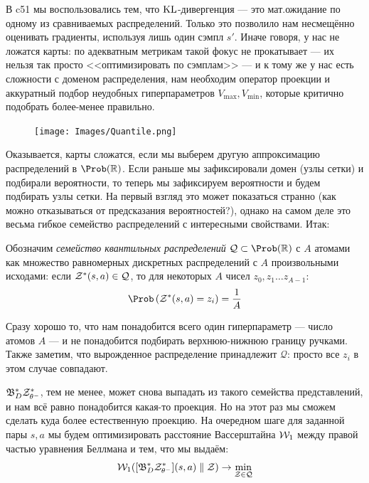 В c51 мы воспользовались тем, что $\operatorname{KL}$-дивергенция --- это мат.ожидание по одному из сравниваемых распределений. Только это позволило нам несмещённо оценивать градиенты, используя лишь один сэмпл $s'$. Иначе говоря, у нас не ложатся карты: по адекватным метрикам такой фокус не прокатывает --- их нельзя так просто <<оптимизировать по сэмплам>> --- и к тому же у нас есть сложности с доменом распределения, нам необходим оператор проекции и аккуратный подбор неудобных гиперпараметров $V_{\max}, V_{\min}$, которые критично подобрать более-менее правильно.

\begin{figure}
\vspace{-0.3cm}
\centering
\texttt{[image: Images/Quantile.png]}
\vspace{-1.4cm}
\end{figure}

Оказывается, карты сложатся, если мы выберем другую аппроксимацию распределений в $\Prob (\R)$. Если раньше мы зафиксировали домен (узлы сетки) и подбирали вероятности, то теперь мы зафиксируем вероятности и будем подбирать узлы сетки. На первый взгляд это может показаться странно (как можно отказываться от предсказания вероятностей?), однако на самом деле это весьма гибкое семейство распределений с интересными свойствами. Итак:

\begin{definition}
Обозначим \emph{семейство квантильных распределений} $\mathcal{Q} \subset \Prob(\R)$ с $A$ атомами как множество равномерных дискретных распределений с $A$ произвольными исходами: если $\mathcal{Z}^*(s, a) \in \mathcal{Q}$, то для некоторых $A$ чисел $z_0, z_1 \dots z_{A-1} \colon$
$$\Prob \left( \Z^*(s, a) = z_i \right) = \frac{1}{A}$$
\end{definition}

Сразу хорошо то, что нам понадобится всего один гиперпараметр --- число атомов $A$ --- и не понадобится подбирать верхнюю-нижнюю границу ручками. Также заметим, что вырожденное распределение принадлежит $\mathcal{Q}$: просто все $z_i$ в этом случае совпадают.

$\mathfrak{B}^*_D \mathcal{Z}^*_{\theta^-}$, тем не менее, может снова выпадать из такого семейства представлений, и нам всё равно понадобится какая-то проекция. Но на этот раз мы сможем сделать куда более естественную проекцию. На очередном шаге для заданной пары $s, a$ мы будем оптимизировать расстояние Вассерштайна $\mathcal{W}_1$ между правой частью уравнения Беллмана и тем, что мы выдаём:
\begin{equation}\label{qprojection}
\mathcal{W}_1 ([\mathfrak{B}^*_D \mathcal{Z}^*_{\theta^-}](s, a) \parallel \mathcal{Z}) \to \min_{\mathcal{Z} \in \mathcal{Q}}
\end{equation}

